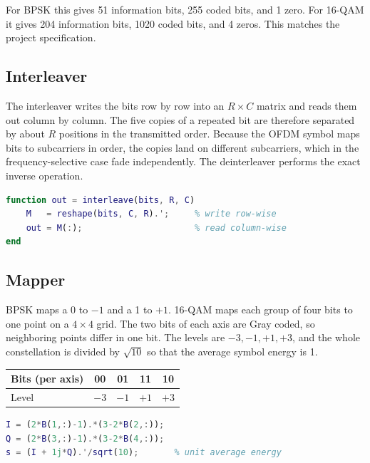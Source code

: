 \documentclass[11pt,a4paper]{article}
\begin{document}
For BPSK this gives 51 information bits, 255 coded bits, and 1 zero. For 16-QAM it gives 204 information bits, 1020 coded bits, and 4 zeros. This matches the project specification.

\subsection{Interleaver}

The interleaver writes the bits row by row into an $R \times C$ matrix and reads them out column by column. The five copies of a repeated bit are therefore separated by about $R$ positions in the transmitted order. Because the OFDM symbol maps bits to subcarriers in order, the copies land on different subcarriers, which in the frequency-selective case fade independently. The deinterleaver performs the exact inverse operation.

\begin{lstlisting}[language=Matlab]
function out = interleave(bits, R, C)
    M   = reshape(bits, C, R).';     % write row-wise
    out = M(:);                      % read column-wise
end
\end{lstlisting}

\subsection{Mapper}

BPSK maps a 0 to $-1$ and a 1 to $+1$. 16-QAM maps each group of four bits to one point on a $4 \times 4$ grid. The two bits of each axis are Gray coded, so neighboring points differ in one bit. The levels are $-3, -1, +1, +3$, and the whole constellation is divided by $\sqrt{10}$ so that the average symbol energy is 1.

\begin{center}
\begin{tabular}{l c c c c}
\toprule
Bits (per axis) & 00 & 01 & 11 & 10 \\
\midrule
Level & $-3$ & $-1$ & $+1$ & $+3$ \\
\bottomrule
\end{tabular}
\end{center}

\begin{lstlisting}[language=Matlab]
% 16-QAM: 4 bits -> I and Q levels
I = (2*B(1,:)-1).*(3-2*B(2,:));
Q = (2*B(3,:)-1).*(3-2*B(4,:));
s = (I + 1j*Q).'/sqrt(10);       % unit average energy
\end{lstlisting}
\end{document}
